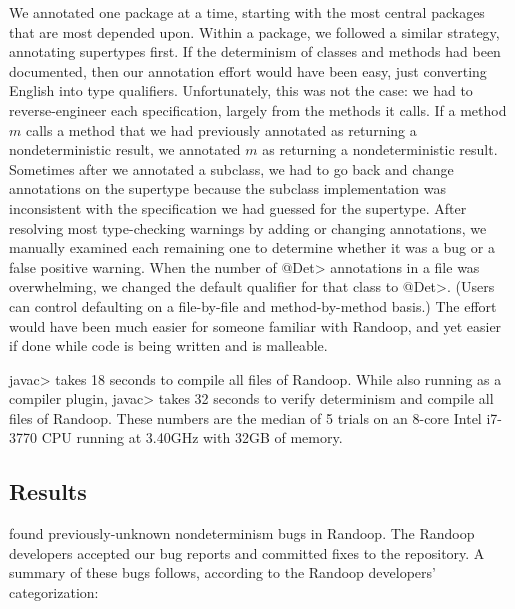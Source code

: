 We annotated one package at a time, starting with the most central packages
that are most depended upon.  Within a package, we followed a similar
strategy, annotating supertypes first.  If the determinism of classes and methods had been
documented, then our annotation effort
would have been easy, just converting English into type qualifiers.
Unfortunately, this was not the case: we had to reverse-engineer each
specification, largely from the methods it calls.  If a method $m$ calls a
method that we had previously annotated as returning a nondeterministic result, we annotated
$m$ as returning a nondeterministic result.
Sometimes after we
annotated a subclass, we had to go back and change annotations on
the supertype because the subclass implementation was
inconsistent with the specification we had guessed for the supertype.
After resolving most type-checking warnings by adding or changing
annotations, we manually examined each remaining one to determine whether
it was a bug or a false positive warning.
When the number of \<@Det> annotations in a file was overwhelming,
we changed the default qualifier for that class to \<@Det>.  (Users
  can control defaulting on a file-by-file and method-by-method basis.)
The effort would have been much easier for someone familiar with Randoop,
and yet easier if done while code is being written and is malleable.

\<javac> takes 18 seconds to compile all files of Randoop.
While also running \theDeterminismChecker as a compiler plugin, \<javac> takes 32 seconds to verify determinism and compile all files of Randoop.
These numbers are the median of 5 trials on an 8-core Intel i7-3770 CPU running at 3.40GHz with 
32GB of memory.


\subsection{Results}

\TheDeterminismChecker found \numRandoopBugs previously-unknown nondeterminism bugs in Randoop.
The Randoop developers accepted our bug reports and committed fixes to the repository. A summary
of these bugs follows, according to the Randoop developers' categorization:

